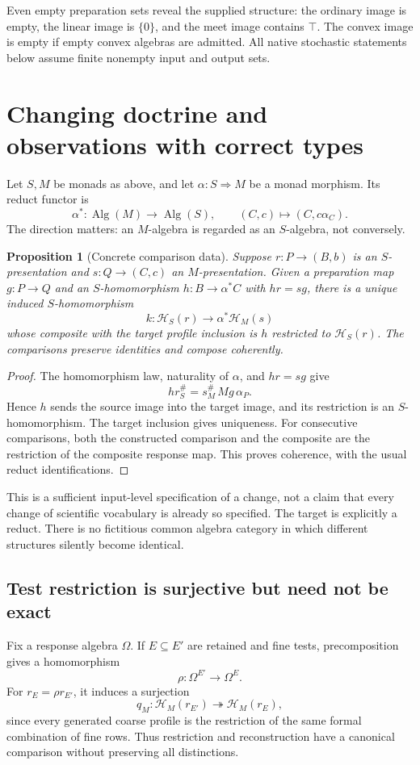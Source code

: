 \documentclass[11pt]{article}
\newtheorem{proposition}[theorem]{Proposition}
\DeclareMathOperator{\Alg}{Alg}
\newcommand{\HH}{\mathcal H}
\begin{document}
Even empty preparation sets reveal the supplied structure: the ordinary image is empty, the linear image is $\{0\}$, and the meet image contains $\top$. The convex image is empty if empty convex algebras are admitted. All native stochastic statements below assume finite nonempty input and output sets.

\section{Changing doctrine and observations with correct types}
\label{sec:changes}

Let $S,M$ be monads as above, and let $\alpha:S\Rightarrow M$ be a monad morphism. Its reduct functor is
\[
 \alpha^*:\Alg(M)\longrightarrow\Alg(S),
 \qquad (C,c)\longmapsto(C,c\alpha_C).
\]
The direction matters: an $M$-algebra is regarded as an $S$-algebra, not conversely.

\begin{proposition}[Concrete comparison data]
Suppose $r:P\to(B,b)$ is an $S$-presentation and $s:Q\to(C,c)$ an $M$-presentation. Given a preparation map $g:P\to Q$ and an $S$-homomorphism $h:B\to\alpha^*C$ with $hr=sg$, there is a unique induced $S$-homomorphism
\[
 k:\HH_S(r)\longrightarrow\alpha^*\HH_M(s)
\]
whose composite with the target profile inclusion is $h$ restricted to $\HH_S(r)$. The comparisons preserve identities and compose coherently.
\end{proposition}

\begin{proof}
The homomorphism law, naturality of $\alpha$, and $hr=sg$ give
\[
 h r_S^\#=s_M^\#\,Mg\,\alpha_P.
\]
Hence $h$ sends the source image into the target image, and its restriction is an $S$-homomorphism. The target inclusion gives uniqueness. For consecutive comparisons, both the constructed comparison and the composite are the restriction of the composite response map. This proves coherence, with the usual reduct identifications.
\end{proof}

This is a sufficient input-level specification of a change, not a claim that every change of scientific vocabulary is already so specified. The target is explicitly a reduct. There is no fictitious common algebra category in which different structures silently become identical.

\subsection{Test restriction is surjective but need not be exact}
Fix a response algebra $\Omega$. If $E\subseteq E'$ are retained and fine tests, precomposition gives a homomorphism
\[
 \rho:\Omega^{E'}\longrightarrow\Omega^E.
\]
For $r_E=\rho r_{E'}$, it induces a surjection
\[
 q_M:\HH_M(r_{E'})\twoheadrightarrow\HH_M(r_E),
\]
since every generated coarse profile is the restriction of the same formal combination of fine rows. Thus restriction and reconstruction have a canonical comparison without preserving all distinctions.
\end{document}
